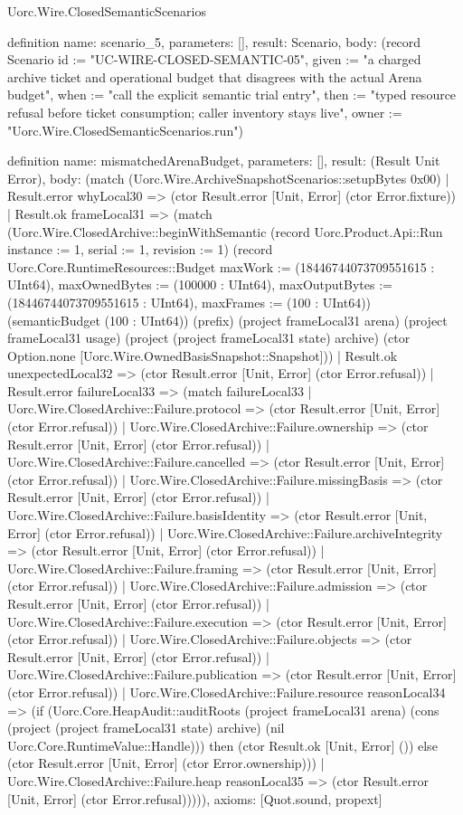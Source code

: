 \begin{lexlean}{Uorc.Wire.ClosedSemanticScenarios}
\begin{semanticmodule}
definition{
  name: scenario_5,
  parameters: [],
  result: Scenario,
  body: (record Scenario {id := "UC-WIRE-CLOSED-SEMANTIC-05", given := "a charged archive ticket and operational budget that disagrees with the actual Arena budget", when := "call the explicit semantic trial entry", then := "typed resource refusal before ticket consumption; caller inventory stays live", owner := "Uorc.Wire.ClosedSemanticScenarios.run"})
}

definition{
  name: mismatchedArenaBudget,
  parameters: [],
  result: (Result Unit Error),
  body: (match (Uorc.Wire.ArchiveSnapshotScenarios::setupBytes 0x00)
    | Result.error whyLocal30 => (ctor Result.error [Unit, Error] (ctor Error.fixture))
    | Result.ok frameLocal31 => (match (Uorc.Wire.ClosedArchive::beginWithSemantic (record Uorc.Product.Api::Run {instance := 1, serial := 1, revision := 1}) (record Uorc.Core.RuntimeResources::Budget {maxWork := (18446744073709551615 : UInt64), maxOwnedBytes := (100000 : UInt64), maxOutputBytes := (18446744073709551615 : UInt64), maxFrames := (100 : UInt64)}) (semanticBudget (100 : UInt64)) (prefix) (project frameLocal31 arena) (project frameLocal31 usage) (project (project frameLocal31 state) archive) (ctor Option.none [Uorc.Wire.OwnedBasisSnapshot::Snapshot]))
      | Result.ok unexpectedLocal32 => (ctor Result.error [Unit, Error] (ctor Error.refusal))
      | Result.error failureLocal33 => (match failureLocal33
        | Uorc.Wire.ClosedArchive::Failure.protocol => (ctor Result.error [Unit, Error] (ctor Error.refusal))
        | Uorc.Wire.ClosedArchive::Failure.ownership => (ctor Result.error [Unit, Error] (ctor Error.refusal))
        | Uorc.Wire.ClosedArchive::Failure.cancelled => (ctor Result.error [Unit, Error] (ctor Error.refusal))
        | Uorc.Wire.ClosedArchive::Failure.missingBasis => (ctor Result.error [Unit, Error] (ctor Error.refusal))
        | Uorc.Wire.ClosedArchive::Failure.basisIdentity => (ctor Result.error [Unit, Error] (ctor Error.refusal))
        | Uorc.Wire.ClosedArchive::Failure.archiveIntegrity => (ctor Result.error [Unit, Error] (ctor Error.refusal))
        | Uorc.Wire.ClosedArchive::Failure.framing => (ctor Result.error [Unit, Error] (ctor Error.refusal))
        | Uorc.Wire.ClosedArchive::Failure.admission => (ctor Result.error [Unit, Error] (ctor Error.refusal))
        | Uorc.Wire.ClosedArchive::Failure.execution => (ctor Result.error [Unit, Error] (ctor Error.refusal))
        | Uorc.Wire.ClosedArchive::Failure.objects => (ctor Result.error [Unit, Error] (ctor Error.refusal))
        | Uorc.Wire.ClosedArchive::Failure.publication => (ctor Result.error [Unit, Error] (ctor Error.refusal))
        | Uorc.Wire.ClosedArchive::Failure.resource reasonLocal34 => (if (Uorc.Core.HeapAudit::auditRoots (project frameLocal31 arena) (cons (project (project frameLocal31 state) archive) (nil Uorc.Core.RuntimeValue::Handle))) then (ctor Result.ok [Unit, Error] ()) else (ctor Result.error [Unit, Error] (ctor Error.ownership)))
        | Uorc.Wire.ClosedArchive::Failure.heap reasonLocal35 => (ctor Result.error [Unit, Error] (ctor Error.refusal))))),
  axioms: [Quot.sound, propext]
}


\end{semanticmodule}
\end{lexlean}
